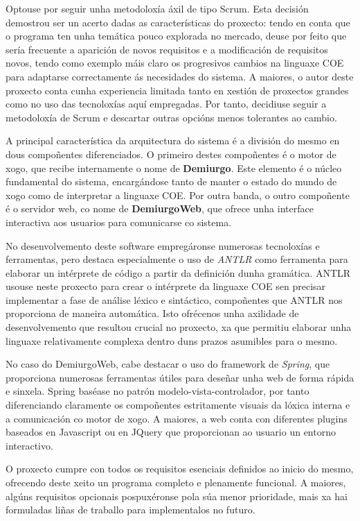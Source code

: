 Optouse por seguir unha metodoloxía áxil de tipo Scrum. Esta decisión demostrou
ser un acerto dadas as características do proxecto: tendo en conta que o
programa ten unha temática pouco explorada no mercado, deuse por feito que sería
frecuente a aparición de novos requisitos e a modificación de requisitos novos,
tendo como exemplo máis claro os progresivos cambios na linguaxe COE para
adaptarse correctamente ás necesidades do sistema.
A maiores, o autor deste proxecto conta cunha experiencia limitada tanto en
xestión de proxectos grandes como no uso das tecnoloxías aquí empregadas. Por
tanto, decidiuse seguir a metodoloxía de Scrum e descartar outras opcións menos
tolerantes ao cambio.

A principal característica da arquitectura do sistema é a división do mesmo en
dous compoñentes diferenciados. O primeiro destes compoñentes é o motor de xogo,
que recibe internamente o nome de \textbf{Demiurgo}. Este elemento é o
núcleo fundamental do sistema, encargándose tanto de manter o estado do mundo de
xogo como de interpretar a linguaxe COE. Por outra banda, o outro compoñente é o
servidor web, co nome de \textbf{DemiurgoWeb}, que ofrece unha interface
interactiva aos usuarios para comunicarse co sistema.

No desenvolvemento deste software empregáronse numerosas tecnoloxías e
ferramentas, pero destaca especialmente o uso de \textit{ANTLR} como ferramenta
para elaborar un intérprete de código a partir da definición dunha gramática.
ANTLR usouse neste proxecto para crear o intérprete da linguaxe COE sen precisar
implementar a fase de análise léxico e sintáctico, compoñentes que ANTLR nos
proporciona de maneira automática. Isto ofrécenos unha axilidade de
desenvolvemento que resultou crucial no proxecto, xa que permitiu elaborar unha
linguaxe relativamente complexa dentro duns prazos asumibles para o mesmo.

No caso do DemiurgoWeb, cabe destacar o uso do framework de \textit{Spring}, que
proporciona numerosas ferramentas útiles para deseñar unha web de forma rápida e
sinxela. Spring baséase no patrón modelo-vista-controlador, por
tanto diferenciando claramente os compoñentes estritamente visuais da lóxica
interna e a comunicación co motor de xogo. A maiores, a web conta con diferentes
plugins baseados en Javascript ou en JQuery que proporcionan ao usuario un
entorno interactivo.

O proxecto cumpre con todos os requisitos esenciais definidos ao inicio do
mesmo, ofrecendo deste xeito un programa completo e plenamente funcional. A
maiores, algúns requisitos opcionais pospuxéronse pola súa menor prioridade,
mais xa hai formuladas liñas de traballo para implementalos no futuro.

